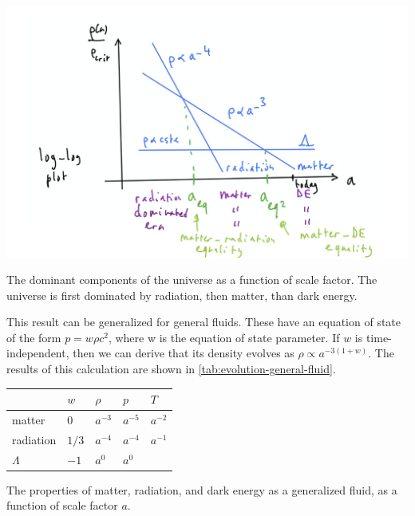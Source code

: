 \begin{marginfigure}
	\centering
	\includegraphics[width=\textwidth]{img/ch-02/domination.png}
	\caption{The dominant components of the universe as a function of scale factor. The universe is first dominated by radiation, then matter, than dark energy.}
	\label{fig:domination}
\end{marginfigure}

This result can be generalized for general fluids.
These have an equation of state of the form $p = w \rho c^2$, where \gls{w} is the equation of state parameter.
If $w$ is time-independent, then we can derive that its density evolves as $\rho \propto a^{-3(1+w)}$.
The results of this calculation are shown in \cref{tab:evolution-general-fluid}.

\begin{margintable}
	\footnotesize
	\begin{tabular}{lllll}
	\toprule
	 & $w$ & $\rho$ & $p$ & $T$\\
	\midrule
	matter & $0$ &  $a^{-3}$ & $a^{-5}$ & $a^{-2}$\\
	radiation & $1/3$ & $a^{-4}$ & $a^{-4}$ & $a^{-1}$\\
	$\Lambda$ & $-1$ & $a^{0}$ & $a^{0}$ & \\
	\bottomrule
	\end{tabular}
	\caption{The properties of matter, radiation, and dark energy as a generalized fluid, as a function of scale factor $a$.}
	\label{tab:evolution-general-fluid}
\end{margintable}

